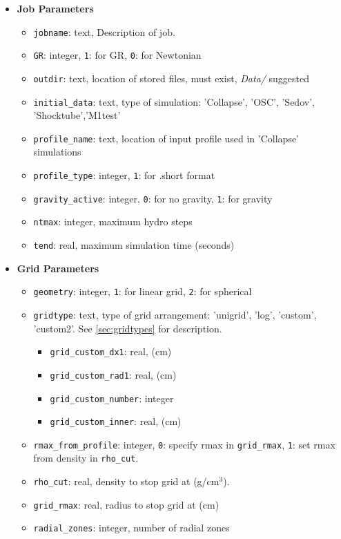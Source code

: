 \documentclass[10pt,nofootinbib]{article}
\newcommand{\code}[1]{\texttt{#1}}
\begin{document}
\begin{itemize}
\item{{\bf Job Parameters}}
\begin{itemize}
\item{{\tt jobname}: text, Description of job.}
\item{{\tt GR}: integer, \code{1}: for GR, \code{0}: for Newtonian}
\item{{\tt outdir}: text, location of stored files, must exist, {\it
    Data/} suggested}
\item{{\tt initial\_data}: text, type of simulation: 'Collapse',
  'OSC', 'Sedov', 'Shocktube','M1test'}
\item{{\tt profile\_name}: text, location of input profile used in 'Collapse' simulations}
\item{{\tt profile\_type}: integer, \code{1}: for .short format}
\item{{\tt gravity\_active}: integer, \code{0}: for no gravity, \code{1}: for gravity}
\item{{\tt ntmax}: integer, maximum hydro steps}
\item{{\tt tend}: real, maximum simulation time (seconds)}
\end{itemize}
\item{{\bf Grid Parameters}}
\begin{itemize}
\item{{\tt geometry}: integer, \code{1}: for linear grid, \code{2}: for spherical}
\item{{\tt gridtype}: text, type of grid arrangement: 'unigrid', 'log', 'custom', 'custom2'.  See \ref{sec:gridtypes} for description}.
\begin{itemize}
\item{{\tt grid\_custom\_dx1}: real, (cm)}
\item{{\tt grid\_custom\_rad1}: real, (cm)}
\item{{\tt grid\_custom\_number}: integer}
\item{{\tt grid\_custom\_inner}: real, (cm)}
\end{itemize}
\item{{\tt rmax\_from\_profile}: integer, \code{0}: specify rmax in {\tt grid\_rmax}, \code{1}: set rmax from density in {\tt rho\_cut}}.
\item{{\tt rho\_cut}: real, density to stop grid at (g/cm$^3$)}.
\item{{\tt grid\_rmax}: real, radius to stop grid at (cm)}
\item{{\tt radial\_zones}: integer, number of radial zones}

\end{itemize}
\end{itemize}
\end{document}
